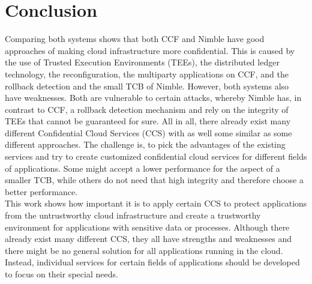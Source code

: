 \section{Conclusion}
Comparing both systems shows that both CCF and Nimble have good approaches of making cloud infrastructure more confidential. This is caused by the use of Trusted Execution Environments (TEEs), the distributed ledger technology, the reconfiguration, the multiparty applications on CCF, and the rollback detection and the small TCB of Nimble. However, both systems also have weaknesses. Both are vulnerable to certain attacks, whereby Nimble has, in contrast to CCF, a rollback detection mechanism and rely on the integrity of TEEs that cannot be guaranteed for sure.
All in all, there already exist many different Confidential Cloud Services (CCS) with as well some similar as some different approaches. The challenge is, to pick the advantages of the existing services and try to create customized confidential cloud services for different fields of applications. Some might accept a lower performance for the aspect of a smaller TCB, while others do not need that high integrity and therefore choose a better performance.\\
 This work shows how important it is to apply certain CCS to protect applications from the untrustworthy cloud infrastructure and create a trustworthy environment for applications with sensitive data or processes. Although there already exist many different CCS, they all have strengths and weaknesses and there might be no general solution for all applications running in the cloud. Instead, individual services for certain fields of applications should be developed to focus on their special needs.